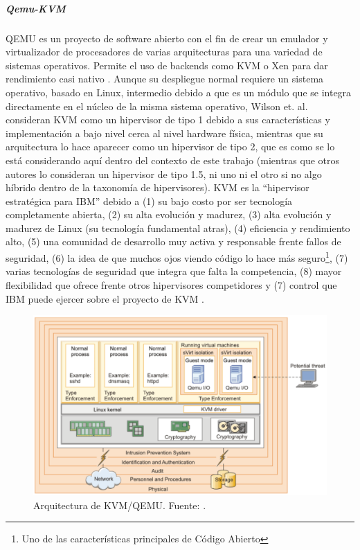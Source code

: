 \subparagraph{Qemu-KVM}
QEMU es un proyecto de software abierto con el fin de crear un emulador y virtualizador de procesadores de varias arquitecturas para una variedad de sistemas operativos. Permite el uso de backends como KVM o Xen para dar rendimiento casi nativo \citep{QEMU}. Aunque su despliegue normal requiere un sistema operativo, basado en Linux, intermedio debido a que es un módulo que se integra directamente en el núcleo de la misma sistema operativo, Wilson et. al. consideran KVM como un hipervisor de tipo 1 debido a sus características y implementación a bajo nivel cerca al nivel hardware física, mientras que su arquitectura lo hace aparecer como un hipervisor de tipo 2, que es como se lo está considerando aquí dentro del contexto de este trabajo (mientras que otros autores lo consideran un hipervisor de tipo 1.5, ni uno ni el otro si no algo híbrido dentro de la taxonomía de hipervisores). KVM es la “hipervisor estratégica para IBM” debido a (1) su bajo costo por ser tecnología completamente abierta, (2) su alta evolución y madurez, (3) alta evolución y madurez de Linux (su tecnología fundamental atras), (4) eficiencia y rendimiento alto, (5) una comunidad de desarrollo muy activa y responsable frente fallos de seguridad, (6) la idea de que muchos ojos viendo código lo hace más seguro\footnote{Uno de las características principales de Código Abierto}, (7) varias tecnologías de seguridad que integra que falta la competencia, (8) mayor flexibilidad que ofrece frente otros hipervisores competidores y (7) control que IBM puede ejercer sobre el proyecto de KVM \citep{IBM-KVM-Security}.

\begin{figure}
  \begin{center}
      \includegraphics[width=\textwidth]{Figures/kvm-arq.png}
  \end{center}
  \caption{Arquitectura de KVM/QEMU. Fuente: \citep{IBM-KVM-Security}.}
  \label{KVM-Arq}
\end{figure}

